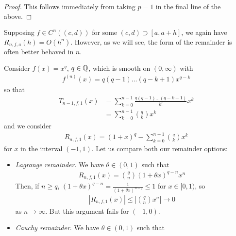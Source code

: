 \documentclass{../template/note}
\begin{document}
    \begin{proof}
        This follows immediately from taking \(p=1\) in the final line of the above.
    \end{proof}
    
    
    \begin{remark*}
        Supposing \(f \in C^n((c, d))\) for some \((c, d) \supset [a, a+h]\), we again have \(R_{n,f,a}(h) = O(h^n)\). However, as we will see, the form of the remainder is often better behaved in \(n\).
    \end{remark*}
    
    \begin{example*}
        Consider \(f(x) = x^q\), \(q \in \mathbb Q\), which is smooth on \((0, \infty)\) with
        \begin{align*}
            f^{(n)}(x) = q (q-1) \dots (q-k+1) x^{q-k}
        \end{align*}
        so that
        \begin{align*}
            T_{n-1,f,1}(x) &= \sum_{k=0}^{n-1} \frac{q(q-1) \dots (q-k+1)}{k!}x^k \\
            &= \sum_{k=0}^{n-1} \binom q k x^k
        \end{align*}
        and we consider
        \begin{align*}
            R_{n,f,1}(x) = (1+x)^q - \sum_{k=0}^{n-1} \binom q k x^k
        \end{align*}
        for \(x\) in the interval \((-1, 1)\). Let us compare both our remainder options:
        \begin{itemize}
            \item \emph{Lagrange remainder}. We have \(\theta \in (0, 1)\) such that
            \begin{align*}
                R_{n,f,1}(x) = \binom q n (1+\theta x)^{q-n}x^n
            \end{align*}
            Then, if \(n \geq q\), \((1+\theta x)^{q-n} = \frac 1{(1+\theta x)^{n-q}} \leq 1\) for \(x \in [0, 1)\), so
            \begin{align*}
                |R_{n,f,1}(x)| \leq \left|\binom q n x^n\right| \to 0
            \end{align*}
            as \(n \to \infty\). But this argument fails for \((-1, 0)\).
            \item \emph{Cauchy remainder}. We have \(\theta \in (0, 1)\) such that
            \begin{align*}

\end{align*}
\end{itemize}
\end{example*}
\end{document}
